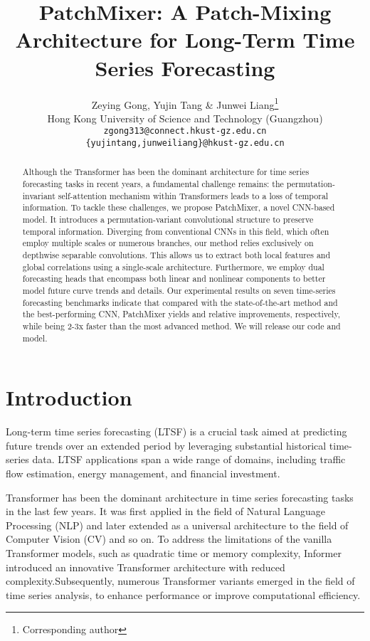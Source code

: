 \documentclass{article} \usepackage{iclr2024_conference,times}
\title{PatchMixer: A Patch-Mixing Architecture for Long-Term Time Series Forecasting}
\author{Zeying Gong, Yujin Tang \& Junwei Liang\thanks{Corresponding author} \\
Hong Kong University of Science and Technology (Guangzhou)\\
\texttt{zgong313@connect.hkust-gz.edu.cn}\\
\texttt{\{yujintang,junweiliang\}@hkust-gz.edu.cn} 
}
\begin{document}
\maketitle

\begin{abstract}




Although the Transformer has been the dominant architecture for time series forecasting tasks in recent years, a fundamental challenge remains: the permutation-invariant self-attention mechanism within Transformers leads to a loss of temporal information. 
To tackle these challenges, we propose PatchMixer, a novel CNN-based model. It introduces a permutation-variant convolutional structure to preserve temporal information. Diverging from conventional CNNs in this field, which often employ multiple scales or numerous branches, our method relies exclusively on depthwise separable convolutions. This allows us to extract both local features and global correlations using a single-scale architecture. Furthermore, we employ dual forecasting heads that encompass both linear and nonlinear components to better model future curve trends and details.
Our experimental results on seven time-series forecasting benchmarks indicate that compared with the state-of-the-art method and the best-performing CNN, PatchMixer yields  and  relative improvements, respectively, while being 2-3x faster than the most advanced method.
We will release our code and model.

\end{abstract}

\section{Introduction}

Long-term time series forecasting (LTSF) is a crucial task aimed at predicting future trends over an extended period by leveraging substantial historical time-series data.
LTSF applications span a wide range of domains, including traffic flow estimation, energy management, and financial investment.



Transformer \citep{transformer} has been the dominant architecture in time series forecasting tasks in the last few years. 
It was first applied in the field of Natural Language Processing (NLP) and later extended as a universal architecture to the field of Computer Vision (CV) and so on. To address the limitations of the vanilla Transformer models, such as quadratic time or memory complexity, Informer \citep{informer} introduced an innovative Transformer architecture with reduced complexity.Subsequently, numerous Transformer variants \citep{autoformer, fedformer, pyraformer} emerged in the field of time series analysis, to enhance performance or improve computational efficiency.
\end{document}
